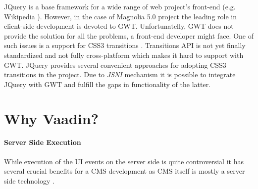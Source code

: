 JQuery is a base framework for a wide range of web project's front-end (e.g.
Wikipedia \cite{jquery}). However, in the case of Magnolia 5.0 project the
leading role in client-side development is devoted to GWT. Unfortunatelly, GWT
does not provide the solution for all the problems, a front-end developer might face.
One of such issues is a support for CSS3 transitions \cite{ccs3_transitions}.
Transitions API is not yet finally standardized and not fully cross-platform
which makes it hard to support with GWT. JQuery provides several convenient
approaches for adopting CSS3 transitions in the project. Due to \emph{JSNI}
mechanism it is possible to integrate JQuery with GWT and fulfill the gaps in
functionality of the latter. 
 
\section{Why Vaadin?}
\paragraph {Server Side Execution}
While execution of the UI events on the server side is quite controversial it
has several crucial benefits for a CMS development as CMS itself is mostly a
server side technology \cite{why_vaadin_philipp}.

